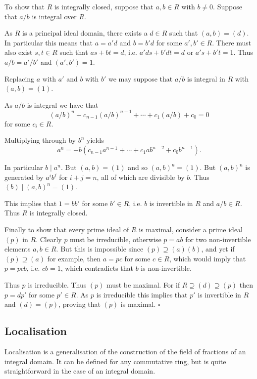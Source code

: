 \documentclass[10pt]{article}
\newcommand{\qed}{\square}
\begin{document}
To show that $R$ is integrally closed, suppose that $a, b \in R$ with $b \neq 0$. Suppose that $a/b$ is integral over $R$.

As $R$ is a principal ideal domain, there exists a $d \in R$ such that $(a, b) = (d)$. In particular this means that $a = a'd$ and $b = b'd$ for some $a', b' \in R$. There must also exist $s, t \in R$ such that $as + bt = d$, i.e. $a'ds + b'dt = d$ or $a's + b't = 1$. Thus $a/b = a'/b'$ and $(a', b') = 1$.

Replacing $a$ with $a'$ and $b$ with $b'$ we may suppose that $a/b$ is integral in $R$ with $(a, b) = (1)$.

As $a/b$ is integral we have that
$$(a/b)^n + c_{n-1}(a/b)^{n-1} + \cdots + c_1(a/b) + c_0 = 0$$
for some $c_i \in R$.

Multiplying through by $b^n$ yields
$$a^n = -b(c_{n-1}a^{n-1} + \cdots + c_1ab^{n-2} + c_0b^{n-1}).$$

In particular $b \;|\; a^n$. But $(a, b) = (1)$ and so $(a, b)^n = (1)$. But $(a, b)^n$ is generated by $a^ib^j$ for $i + j = n$, all of which are divisible by $b$. Thus $(b) \;|\; (a, b)^n = (1)$.

This implies that $1 = bb'$ for some $b' \in R$, i.e. $b$ is invertible in $R$ and $a/b \in R$. Thus $R$ is integrally closed.

Finally to show that every prime ideal of $R$ is maximal, consider a prime ideal $(p)$ in $R$. Clearly $p$ must be irreducible, otherwise $p = ab$ for two non-invertible elements $a, b \in R$. But this is impossible since $(p) \supseteq (a)(b)$, and yet if $(p) \supseteq (a)$ for example, then $a = pc$ for some $c \in R$, which would imply that $p = pcb$, i.e. $cb = 1$, which contradicts that $b$ is non-invertible.

Thus $p$ is irreducible. Thus $(p)$ must be maximal. For if $R \supseteq (d) \supseteq (p)$ then $p = dp'$ for some $p' \in R$. As $p$ is irreducible this implies that $p'$ is invertible in $R$ and $(d) = (p)$, proving that $(p)$ is maximal. $\qed$

\subsection{Localisation}

Localisation is a generalisation of the construction of the field of fractions of an integral domain. It can be defined for any commutative ring, but is quite straightforward in the case of an integral domain.
\end{document}
